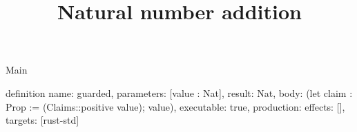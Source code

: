 \begin{lexlean}{Main}
\title{Natural number addition}
\begin{semanticmodule}
definition{
  name: guarded,
  parameters: [value : Nat],
  result: Nat,
  body: (let claim : Prop := (Claims::positive value); value),
  executable: true,
  production: {effects: [], targets: [rust-std]}
}
\end{semanticmodule}
\end{lexlean}
